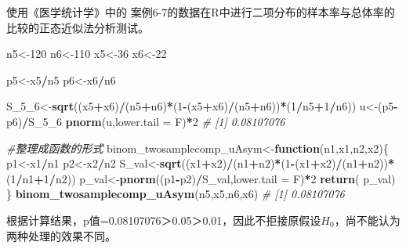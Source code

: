 \documentclass[
]{article}
\newenvironment{Shaded}{\begin{snugshade}}{\end{snugshade}}
\newcommand{\CommentTok}[1]{\textcolor[rgb]{0.56,0.35,0.01}{\textit{#1}}}
\newcommand{\ControlFlowTok}[1]{\textcolor[rgb]{0.13,0.29,0.53}{\textbf{#1}}}
\newcommand{\DataTypeTok}[1]{\textcolor[rgb]{0.13,0.29,0.53}{#1}}
\newcommand{\DecValTok}[1]{\textcolor[rgb]{0.00,0.00,0.81}{#1}}
\newcommand{\KeywordTok}[1]{\textcolor[rgb]{0.13,0.29,0.53}{\textbf{#1}}}
\newcommand{\NormalTok}[1]{#1}
\newcommand{\OperatorTok}[1]{\textcolor[rgb]{0.81,0.36,0.00}{\textbf{#1}}}
\begin{document}
使用《医学统计学》中的 案例6-7的数据在R中进行二项分布的样本率与总体率的比较的正态近似法分析测试。

\begin{Shaded}
\begin{Highlighting}[]
\NormalTok{n5<-}\DecValTok{120}
\NormalTok{n6<-}\DecValTok{110}
\NormalTok{x5<-}\DecValTok{36}
\NormalTok{x6<-}\DecValTok{22}

\NormalTok{p5<-x5}\OperatorTok{/}\NormalTok{n5}
\NormalTok{p6<-x6}\OperatorTok{/}\NormalTok{n6}

\NormalTok{S_}\DecValTok{5}\NormalTok{_}\DecValTok{6}\NormalTok{<-}\KeywordTok{sqrt}\NormalTok{((x5}\OperatorTok{+}\NormalTok{x6)}\OperatorTok{/}\NormalTok{(n5}\OperatorTok{+}\NormalTok{n6)}\OperatorTok{*}\NormalTok{(}\DecValTok{1}\OperatorTok{-}\NormalTok{(x5}\OperatorTok{+}\NormalTok{x6)}\OperatorTok{/}\NormalTok{(n5}\OperatorTok{+}\NormalTok{n6))}\OperatorTok{*}\NormalTok{(}\DecValTok{1}\OperatorTok{/}\NormalTok{n5}\OperatorTok{+}\DecValTok{1}\OperatorTok{/}\NormalTok{n6))}
\NormalTok{u<-(p5}\OperatorTok{-}\NormalTok{p6)}\OperatorTok{/}\NormalTok{S_}\DecValTok{5}\NormalTok{_}\DecValTok{6}
\KeywordTok{pnorm}\NormalTok{(u,}\DataTypeTok{lower.tail =}\NormalTok{ F)}\OperatorTok{*}\DecValTok{2}
\CommentTok{# [1] 0.08107076}

\CommentTok{#整理成函数的形式}
\NormalTok{binom_twosamplecomp_uAsym<-}\ControlFlowTok{function}\NormalTok{(n1,x1,n2,x2)\{}
\NormalTok{  p1<-x1}\OperatorTok{/}\NormalTok{n1}
\NormalTok{  p2<-x2}\OperatorTok{/}\NormalTok{n2}
\NormalTok{  S_val<-}\KeywordTok{sqrt}\NormalTok{((x1}\OperatorTok{+}\NormalTok{x2)}\OperatorTok{/}\NormalTok{(n1}\OperatorTok{+}\NormalTok{n2)}\OperatorTok{*}\NormalTok{(}\DecValTok{1}\OperatorTok{-}\NormalTok{(x1}\OperatorTok{+}\NormalTok{x2)}\OperatorTok{/}\NormalTok{(n1}\OperatorTok{+}\NormalTok{n2))}\OperatorTok{*}\NormalTok{(}\DecValTok{1}\OperatorTok{/}\NormalTok{n1}\OperatorTok{+}\DecValTok{1}\OperatorTok{/}\NormalTok{n2))}
\NormalTok{  p_val<-}\KeywordTok{pnorm}\NormalTok{((p1}\OperatorTok{-}\NormalTok{p2)}\OperatorTok{/}\NormalTok{S_val,}\DataTypeTok{lower.tail =}\NormalTok{ F)}\OperatorTok{*}\DecValTok{2}
  \KeywordTok{return}\NormalTok{( p_val)}
\NormalTok{\}}
\KeywordTok{binom_twosamplecomp_uAsym}\NormalTok{(n5,x5,n6,x6)}
\CommentTok{# [1] 0.08107076}
\end{Highlighting}
\end{Shaded}

根据计算结果，p值=0.08107076＞0.05＞0.01，因此不拒接原假设\(H_0\)，尚不能认为两种处理的效果不同。
\end{document}
